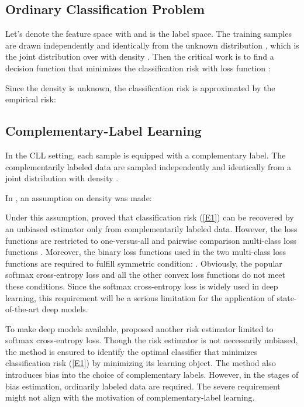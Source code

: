 \documentclass[]{article} \usepackage{geometry}
\begin{document}
\subsection{Ordinary Classification Problem}
Let's denote the feature space with  and  is the label space. The training samples are drawn independently and identically from the unknown distribution , which is the joint distribution over  with density . Then the critical work is to find a decision function  that minimizes the classification risk with loss function :


Since the density  is unknown, the classification risk is approximated by the empirical risk:

\subsection{Complementary-Label Learning}
In the CLL setting, each sample is equipped with a complementary label. The complementarily labeled data  are sampled independently and identically from a joint distribution with density .

In \cite{DBLP:conf/nips/IshidaNHS17}, an assumption on density  was made:

Under this assumption, \cite{DBLP:conf/nips/IshidaNHS17} proved that classification risk (\ref{E1}) can be recovered by an unbiased estimator only from complementarily labeled data. However, the loss functions are restricted to one-versus-all and pairwise comparison multi-class loss functions \cite{TZhang}. Moreover, the binary loss functions  used in the two multi-class loss functions are required to fulfill symmetric condition: . Obviously, the popular softmax cross-entropy loss and all the other convex loss functions do not meet these conditions. Since the softmax cross-entropy loss is widely used in deep learning, this requirement will be a serious limitation for the application of state-of-the-art deep models.

To make deep models available, \cite{DBLP:conf/eccv/YuLGT18} proposed another risk estimator limited to softmax cross-entropy loss. Though the risk estimator is not necessarily unbiased, the method is ensured to identify the optimal classifier that minimizes classification risk (\ref{E1}) by minimizing its learning object. The method also introduces bias into the choice of complementary labels. However, in the stages of bias estimation, ordinarily labeled data are required. The severe requirement might not align with the motivation of complementary-label learning.
\end{document}

